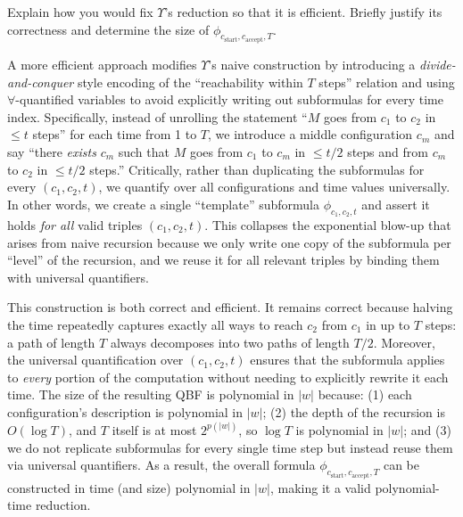 \documentclass[12pt, letterpaper]{article}
\begin{document}
\begin{subproblem}{}
    Explain how you would fix $\Upsilon$'s reduction so that it is efficient. Briefly justify its correctness and determine the size of $\phi_{c_\text{start}, c_\text{accept}, T}$. 
\end{subproblem}
\begin{problemproof}
    A more efficient approach modifies \(\Upsilon\)’s naive construction by introducing a \emph{divide-and-conquer} style encoding of the “reachability within \(T\) steps” relation and using \(\forall\)-quantified variables to avoid explicitly writing out subformulas for every time index. Specifically, instead of unrolling the statement “\(M\) goes from \(c_1\) to \(c_2\) in \(\le t\) steps” for each time from 1 to \(T\), we introduce a middle configuration \(c_m\) and say “there \emph{exists} \(c_m\) such that \(M\) goes from \(c_1\) to \(c_m\) in \(\le t/2\) steps and from \(c_m\) to \(c_2\) in \(\le t/2\) steps.” Critically, rather than duplicating the subformulas for every \((c_1,c_2,t)\), we quantify over all configurations and time values universally. In other words, we create a single “template” subformula \(\phi_{c_1,c_2,t}\) and assert it holds \emph{for all} valid triples \((c_1,c_2,t)\). This collapses the exponential blow-up that arises from naive recursion because we only write one copy of the subformula per “level” of the recursion, and we reuse it for all relevant triples by binding them with universal quantifiers.  

This construction is both correct and efficient. It remains correct because halving the time repeatedly captures exactly all ways to reach \(c_2\) from \(c_1\) in up to \(T\) steps: a path of length \(T\) always decomposes into two paths of length \(T/2\). Moreover, the universal quantification over \((c_1,c_2,t)\) ensures that the subformula applies to \emph{every} portion of the computation without needing to explicitly rewrite it each time. The size of the resulting QBF is polynomial in \(\lvert w\rvert\) because: (1) each configuration’s description is polynomial in \(\lvert w\rvert\); (2) the depth of the recursion is \(O(\log T)\), and \(T\) itself is at most \(2^{p(\lvert w\rvert)}\), so \(\log T\) is polynomial in \(\lvert w\rvert\); and (3) we do not replicate subformulas for every single time step but instead reuse them via universal quantifiers. As a result, the overall formula \(\phi_{c_\text{start}, c_\text{accept}, T}\) can be constructed in time (and size) polynomial in \(\lvert w\rvert\), making it a valid polynomial-time reduction.
\end{problemproof}
\end{document}
